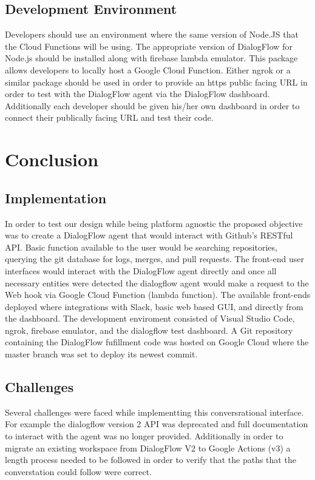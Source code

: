 \documentclass[9pt,software]{livecoms}
\begin{document}
\subsection{Development Environment}
Developers should use an environment where the same version of Node.JS that the Cloud Functions will be using. The appropriate version of DialogFlow for Node.js should be installed along with firebase lambda emulator.
This package allows developers to locally host a Google Cloud Function. Either ngrok or a similar package should be used in order to provide an https public facing URL in order to test with the DialogFlow 
agent via the DialogFlow dashboard. Additionally each developer should be given his/her own dashboard in order to connect their publically facing URL and test their code.

\section{Conclusion}
\subsection{Implementation}
In order to test our design while being platform agnostic the proposed objective was to create a DialogFlow agent that would interact with Github's RESTful API. Basic function available to the user would be searching
repositories, querying the git database for logs, merges, and pull requests. The front-end user interfaces would interact with the DialogFlow agent directly and once all necessary entities were detected the dialogflow agent
would make a request to the Web hook via Google Cloud Function (lambda function). The available front-ends deployed where integrations with Slack, basic web based GUI, and directly from the dashboard. The development enviroment 
consisted of Visual Studio Code, ngrok, firebase emulator, and the dialogflow test dashboard. A Git repository containing the DialogFlow fufillment code was hosted on Google Cloud where the master branch was set to deploy its newest commit.

\subsection{Challenges}
Several challenges were faced while implementting this conversrational interface. For example the dialogflow version 2 API was deprecated and full documentation to interact with the agent was no longer provided. Additionally in order to migrate
an existing workspace from DialogFlow V2 to Google Actions (v3) a length process needed to be followed in order to verify that the paths that the converstation could follow were correct. 
\end{document}
